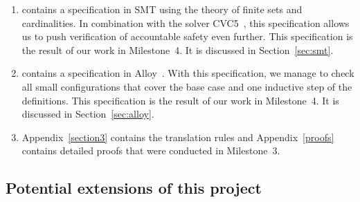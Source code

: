 \begin{enumerate}
    \item \SpecThreeB{} contains a specification in SMT using the theory of
        finite sets and cardinalities. In combination with the solver
        CVC5~\cite{BarbosaBBKLMMMN22}, this specification allows us to push
        verification of accountable safety even further. This specification is
        the result of our work in Milestone~4. It is discussed in
        Section~\ref{sec:smt}.

    \item \SpecThreeC{} contains a specification in
        Alloy~\cite{jackson2012software,alloytools}. With this specification,
        we manage to check all small configurations that cover the base case
        and one inductive step of the definitions. This specification is the
        result of our work in Milestone~4. It is discussed in
        Section~\ref{sec:alloy}.

    \item Appendix~\ref{section3} contains the translation rules and Appendix~\ref{proofs} contains detailed proofs
        that were conducted in Milestone~3.

\end{enumerate}

\subsection{Potential extensions of this project}\label{sec:future}




